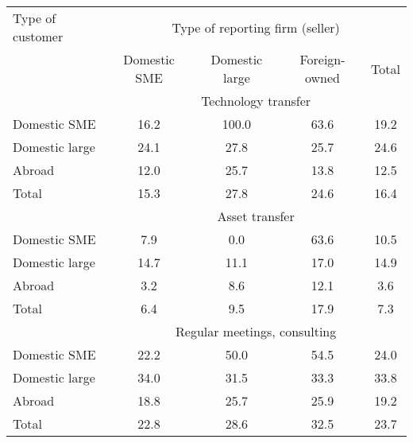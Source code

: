 
\begin{tabular}{lcccc} \hline
Type of customer&	\multicolumn{4}{c}{Type of reporting firm (seller)}	\\		
	&Domestic SME	&Domestic large	&Foreign-owned	&Total\\
	\hline
	\hline
&\multicolumn{4}{c}{Technology transfer}\\
Domestic SME&	16.2&	100.0&	63.6&	19.2\\
Domestic large&	24.1&	27.8&	25.7&	24.6\\
Abroad&	12.0&	25.7&	13.8&	12.5\\
Total&	15.3&	27.8&	24.6&	16.4\\
\hline
&\multicolumn{4}{c}{Asset transfer}\\
Domestic SME&	7.9&	0.0&	63.6&	10.5\\
Domestic large&	14.7&	11.1&	17.0&	14.9\\
Abroad&	3.2&	8.6&	12.1&	3.6\\
Total&	6.4&	9.5&	17.9&	7.3\\
\hline
&\multicolumn{4}{c}{Regular meetings, consulting}\\
Domestic SME&	22.2&	50.0&	54.5&	24.0\\
Domestic large&	34.0&	31.5&	33.3&	33.8\\
Abroad&	18.8&	25.7&	25.9&	19.2\\
Total&	22.8&	28.6&	32.5&	23.7\\
\hline
\end{tabular}

